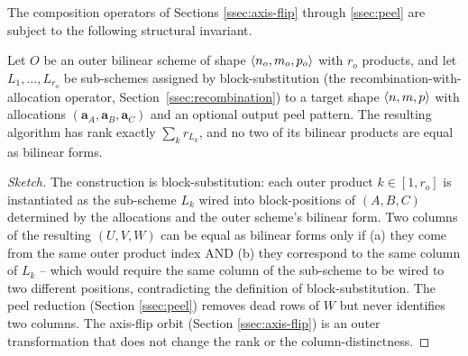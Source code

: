 
The composition operators of Sections \ref{ssec:axis-flip} through
\ref{ssec:peel} are subject to the following structural invariant.

\begin{theorem}\label{thm:nonoverlap}
Let \(O\) be an outer bilinear scheme of shape
\(\langle n_o, m_o, p_o \rangle\) with \(r_o\) products, and let
\(L_1, \ldots, L_{r_o}\) be sub-schemes assigned by block-substitution
(the recombination-with-allocation operator,
Section~\ref{ssec:recombination}) to a target shape
\(\langle n, m, p \rangle\) with allocations \((\mathbf{a}_A, \mathbf{a}_B,
\mathbf{a}_C)\) and an optional output peel pattern. The resulting
algorithm has rank exactly \(\sum_k r_{L_k}\), and no two of its
bilinear products are equal as bilinear forms.
\end{theorem}

\begin{proof}[Sketch]
The construction is block-substitution: each outer product
\(k \in [1, r_o]\) is instantiated as the sub-scheme \(L_k\) wired
into block-positions of \((A, B, C)\) determined by the allocations
and the outer scheme's bilinear form. Two columns of the resulting
\((U, V, W)\) can be equal as bilinear forms only if (a) they come
from the same outer product index AND (b) they correspond to the
same column of \(L_k\) -- which would require the same column of the
sub-scheme to be wired to two different positions, contradicting the
definition of block-substitution. The peel reduction
(Section \ref{ssec:peel}) removes dead rows of \(W\) but never
identifies two columns. The axis-flip orbit (Section
\ref{ssec:axis-flip}) is an outer transformation that does not change
the rank or the column-distinctness.
\end{proof}

